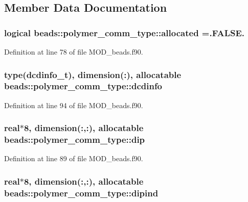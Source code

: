 \subsection{Member Data Documentation}
\hypertarget{structbeads_1_1polymer__comm__type_a0bca96b549d7c6c1b7e204d70ad1c2e7}{
\subsubsection[{allocated}]{\setlength{\rightskip}{0pt plus 5cm}logical beads\-::polymer\-\_\-comm\-\_\-type\-::allocated =.F\-A\-L\-S\-E.}}\label{structbeads_1_1polymer__comm__type_a0bca96b549d7c6c1b7e204d70ad1c2e7}


Definition at line 78 of file M\-O\-D\-\_\-beads.\-f90.

\hypertarget{structbeads_1_1polymer__comm__type_aad5160b3d2116dcc351479cdfded5955}{
\subsubsection[{dcdinfo}]{\setlength{\rightskip}{0pt plus 5cm}type(dcdinfo\-\_\-t), dimension(\-:), allocatable beads\-::polymer\-\_\-comm\-\_\-type\-::dcdinfo}}\label{structbeads_1_1polymer__comm__type_aad5160b3d2116dcc351479cdfded5955}


Definition at line 94 of file M\-O\-D\-\_\-beads.\-f90.

\hypertarget{structbeads_1_1polymer__comm__type_abec558e15b37fe016d649919a75efc26}{
\subsubsection[{dip}]{\setlength{\rightskip}{0pt plus 5cm}real$\ast$8, dimension(\-:,\-:), allocatable beads\-::polymer\-\_\-comm\-\_\-type\-::dip}}\label{structbeads_1_1polymer__comm__type_abec558e15b37fe016d649919a75efc26}


Definition at line 89 of file M\-O\-D\-\_\-beads.\-f90.

\hypertarget{structbeads_1_1polymer__comm__type_a33b425bb71654a52b954f0771db35983}{
\subsubsection[{dipind}]{\setlength{\rightskip}{0pt plus 5cm}real$\ast$8, dimension(\-:,\-:), allocatable beads\-::polymer\-\_\-comm\-\_\-type\-::dipind}}\label{structbeads_1_1polymer__comm__type_a33b425bb71654a52b954f0771db35983}


